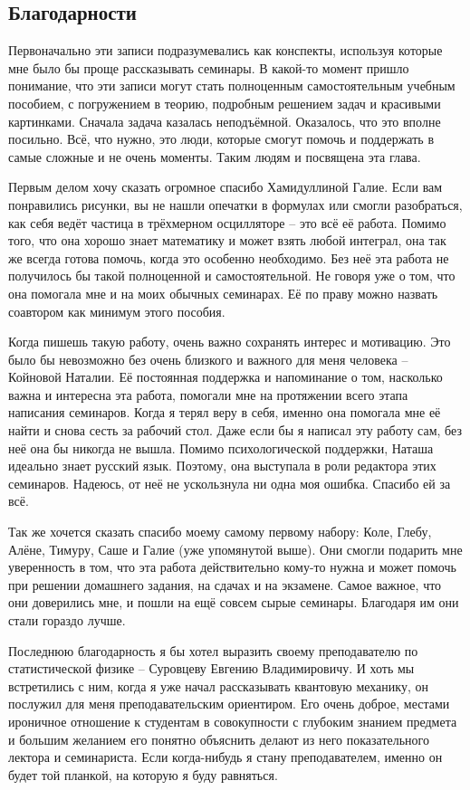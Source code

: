 \begin{center}
    \section{Благодарности}
\end{center}

Первоначально эти записи подразумевались как конспекты, используя которые мне было бы проще рассказывать семинары. В какой-то момент пришло понимание, что эти записи могут стать полноценным самостоятельным учебным пособием, с погружением в теорию, подробным решением задач и красивыми картинками. Сначала задача казалась неподъёмной. Оказалось, что это вполне посильно. Всё, что нужно, это люди, которые смогут помочь и поддержать в самые сложные и не очень моменты. Таким людям и посвящена эта глава.

Первым делом хочу сказать огромное спасибо Хамидуллиной Галие. Если вам понравились рисунки, вы не нашли опечатки в формулах или смогли разобраться, как себя ведёт частица в трёхмерном осцилляторе -- это всё её работа. Помимо того, что она хорошо знает математику и может взять любой интеграл, она так же всегда готова помочь, когда это особенно необходимо. Без неё эта работа не получилось бы такой полноценной и самостоятельной. Не говоря уже о том, что она помогала мне и на моих обычных семинарах. Её по праву можно назвать соавтором как минимум этого пособия.

Когда пишешь такую работу, очень важно сохранять интерес и мотивацию. Это было бы невозможно без очень близкого и важного для меня человека -- Койновой Наталии. Её постоянная поддержка и напоминание о том, насколько важна и интересна эта работа, помогали мне на протяжении всего этапа написания семинаров. Когда я терял веру в себя, именно она помогала мне её найти и снова сесть за рабочий стол. Даже если бы я написал эту работу сам, без неё она бы никогда не вышла. Помимо психологической поддержки, Наташа идеально знает русский язык. Поэтому, она выступала в роли редактора этих семинаров. Надеюсь, от неё не ускользнула ни одна моя ошибка. Спасибо ей за всё.

Так же хочется сказать спасибо моему самому первому набору: Коле, Глебу, Алёне, Тимуру, Саше и Галие (уже упомянутой выше). Они смогли подарить мне уверенность в том, что эта работа действительно кому-то нужна и может помочь при решении домашнего задания, на сдачах и на экзамене. Самое важное, что они доверились мне, и пошли на ещё совсем сырые семинары. Благодаря им они стали гораздо лучше.

Последнюю благодарность я бы хотел выразить своему преподавателю по статистической физике -- Суровцеву Евгению Владимировичу. И хоть мы встретились с ним, когда я уже начал рассказывать квантовую механику, он послужил для меня преподавательским ориентиром. Его очень доброе, местами ироничное отношение к студентам в совокупности с глубоким знанием предмета и большим желанием его понятно объяснить делают из него показательного лектора и семинариста. Если когда-нибудь я стану преподавателем, именно он будет той планкой, на которую я буду равняться. 